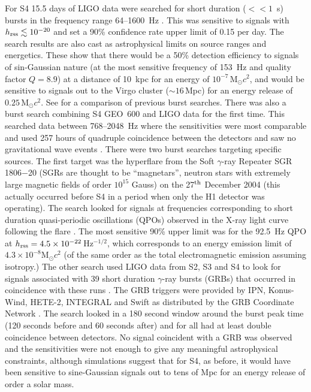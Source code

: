 \documentclass{article}
\begin{document}
For S4 15.5 days of LIGO data were searched for short duration ($<< 1$~s) bursts
in the frequency range 64--1600~Hz \cite{Abbott:2007b}. This was sensitive to
signals with $h_{\rm rss}\lesssim10^{-20}$ and set a 90\% confidence rate
upper limit of 0.15 per day. The search results are also cast as astrophysical
limits on source ranges and energetics. These show that there would be a 50\%
detection efficiency to signals of sin-Gaussian nature (at the most sensitive 
frequency of 153~Hz and quality factor $Q=8.9$) at a distance of 10~kpc for an
energy of $10^{-7}$\,M$_{\odot}c^2$, and would be sensitive to signals out to
the Virgo cluster ($\sim16$\,Mpc) for an energy release of
$0.25$\,M$_{\odot}c^2$. See \cite{Abbott:2007b} for a comparison of previous
burst searches. There was also a burst search combining S4 GEO~600 and LIGO data
for the first time. This searched data between 768--2048~Hz where the
sensitivities were most comparable and used 257 hours of quadruple coincidence
between the detectors and saw no gravitational wave events \cite{Abbott:2008b}.
There were two burst searches targeting specific sources. The first target was
the hyperflare from the Soft $\gamma$-ray Repeater SGR 1806$-$20 (SGRs are
thought to be ``magnetars'', neutron stars with extremely large magnetic fields
of order $10^{15}$ Gauss) on the 27$^{\rm th}$ December 2004 \cite{Hurley:2005}
(this actually occurred before S4 in a period when only the H1 detector was
operating). The search looked for signals at frequencies corresponding to short
duration quasi-periodic oscillations (QPOs) observed in the X-ray light curve
following the flare \cite{Abbott:2007c}. The most sensitive 90\% upper limit was
for the 92.5~Hz QPO at $h_{\rm rss} = 4.5\times10^{-22}$\,Hz$^{-1/2}$, which
corresponds to an energy emission limit of $4.3\times10^{-8}$M$_{\odot}c^2$ (of
the same order as the total electromagnetic emission assuming isotropy.) The
other search used LIGO data from S2, S3 and S4 to look for signals associated
with 39 short duration $\gamma$-ray bursts (GRBs) that occurred in coincidence
with these runs \cite{Abbott:2008c}. The GRB triggers were provided by IPN,
Konus-Wind, HETE-2, INTEGRAL and Swift as distributed by the GRB Coordinate
Network \cite{GCN}. The search looked in a 180 second window around the burst
peak time (120 seconds before and 60 seconds after) and for all had at least
double coincidence between detectors. No signal coincident with a GRB was
observed and the sensitivities were not enough to give any meaningful
astrophysical constraints, although simulations suggest that for S4, as before,
it would have been sensitive to sine-Gaussian signals out to tens of Mpc for an
energy release of order a solar mass.
\end{document}
